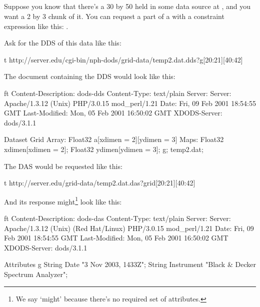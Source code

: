 \documentclass[justify]{nasa-ese}
\begin{document}
\subsection{\Grid}

Suppose you know that there's a 30 by 50 \Grid held in some data source at
, and you want a 2 by 3 chunk of it. You can request a part of
a \Grid with a constraint expression like this: .


Ask for the DDS of this data like this:

\begin{vcode}{t}
http://server.edu/cgi-bin/nph-dods/grid-data/temp2.dat.dds?g[20:21][40:42]
\end{vcode}

The document containing the DDS would look like this:

\begin{vcode}{ft}
Content-Description: dods-dds
Content-Type: text/plain
Server: Server: Apache/1.3.12 (Unix)  PHP/3.0.15 mod_perl/1.21
Date: Fri, 09 Feb 2001 18:54:55 GMT
Last-Modified: Mon, 05 Feb 2001 16:50:02 GMT
XDODS-Server: dods/3.1.1

Dataset {
  Grid {
    Array:
      Float32 a[xdimen = 2][ydimen = 3]
    Maps:
      Float32 xdimen[xdimen = 2];
      Float32 ydimen[ydimen = 3];
  } g;
} temp2.dat;
\end{vcode}

The DAS would be requested like this:

\begin{vcode}{t}
http://server.edu/grid-data/temp2.dat.das?grid[20:21][40:42]
\end{vcode}

And its response might\footnote{We say `might' because there's no
  required set of attributes.} look like this:

\begin{vcode}{ft}
Content-Description: dods-das
Content-Type: text/plain
Server: Server: Apache/1.3.12 (Unix)  (Red Hat/Linux) PHP/3.0.15 mod_perl/1.21
Date: Fri, 09 Feb 2001 18:54:55 GMT
Last-Modified: Mon, 05 Feb 2001 16:50:02 GMT
XDODS-Server: dods/3.1.1

Attributes {
  g {
    String Date "3 Nov 2003, 1433Z";
    String Instrument "Black & Decker Spectrum Analyzer";
  }
}
\end{vcode}
\end{document}
